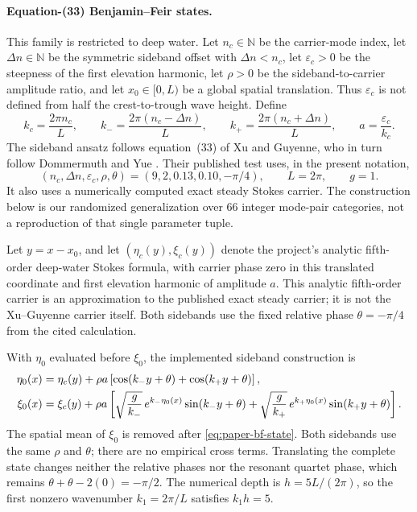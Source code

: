 \paragraph{Equation-(33) Benjamin--Feir states.}
This family is restricted to deep water.  Let $n_c\in\mathbb N$ be the
carrier-mode index, let $\Delta n\in\mathbb N$ be the symmetric sideband
offset with $\Delta n<n_c$, let $\varepsilon_c>0$ be the steepness of the
first elevation harmonic, let $\rho>0$ be the sideband-to-carrier amplitude
ratio, and let $x_0\in[0,L)$ be a global spatial translation.  Thus
$\varepsilon_c$ is not defined from half the crest-to-trough wave height.
Define
\begin{equation}
  k_c=\frac{2\pi n_c}{L},\qquad
  k_-=\frac{2\pi(n_c-\Delta n)}{L},\qquad
  k_+=\frac{2\pi(n_c+\Delta n)}{L},\qquad
  a=\frac{\varepsilon_c}{k_c}.
  \label{eq:paper-bf-wavenumbers}
\end{equation}
The sideband ansatz follows equation~(33) of Xu and Guyenne, who in turn
follow Dommermuth and Yue \cite{dommermuth1987,xu2009}.  Their published test
uses, in the present notation,
\begin{equation}
  (n_c,\Delta n,\varepsilon_c,\rho,\theta)
  =
  (9,2,0.13,0.10,-\pi/4),
  \qquad L=2\pi,\qquad g=1.
  \label{eq:paper-bf-published-tuple}
\end{equation}
It also uses a numerically computed exact steady Stokes carrier.  The
construction below is our randomized generalization over 66 integer
mode-pair categories, not a reproduction of that single parameter tuple.

Let $y=x-x_0$, and let $(\eta_c(y),\xi_c(y))$ denote the project's analytic
fifth-order deep-water Stokes formula, with carrier phase zero in this
translated coordinate and first elevation harmonic of amplitude $a$.  This
analytic fifth-order carrier is an approximation to the published exact
steady carrier; it is not the Xu--Guyenne carrier itself.  Both sidebands use
the fixed relative phase $\theta=-\pi/4$ from the cited calculation.

With $\eta_0$ evaluated before $\xi_0$, the implemented sideband construction
is
\begin{align}
  \eta_0(x)
  &=
  \eta_c(y)+\rho a\left[
    \cos(k_-y+\theta)+\cos(k_+y+\theta)
  \right],
  \notag\\
  \xi_0(x)
  &=
  \xi_c(y)+\rho a\left[
    \sqrt{\frac{g}{k_-}}\,e^{k_-\eta_0(x)}\sin(k_-y+\theta)
    +
    \sqrt{\frac{g}{k_+}}\,e^{k_+\eta_0(x)}\sin(k_+y+\theta)
  \right].
  \label{eq:paper-bf-state}
\end{align}
The spatial mean of $\xi_0$ is removed after
\cref{eq:paper-bf-state}.  Both sidebands use the same $\rho$ and $\theta$;
there are no empirical cross terms.  Translating the complete state changes
neither the relative phases nor the resonant quartet phase, which remains
$\theta+\theta-2(0)=-\pi/2$.  The numerical depth is
$h=5L/(2\pi)$, so the first nonzero wavenumber $k_1=2\pi/L$ satisfies
$k_1h=5$.

